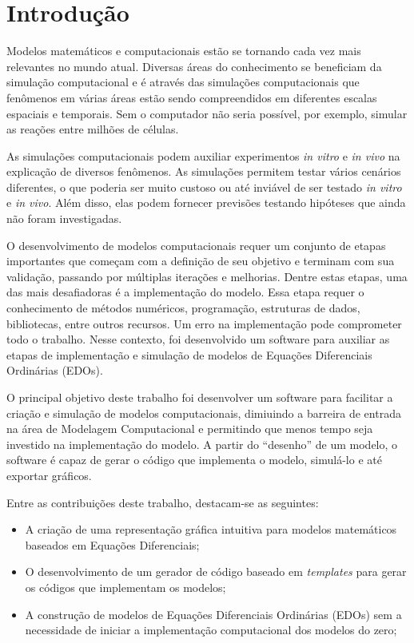 \documentclass[
	12pt,				%
	openright,			%
	oneside,			%
	a4paper,			%
	main=brazil,
	english,			%
	]{ufsj-abntex2}
\begin{document}
\chapter{Introdução}

Modelos matemáticos e computacionais estão se tornando cada vez mais relevantes no mundo atual. Diversas áreas do conhecimento se beneficiam da simulação computacional e é através das simulações computacionais que fenômenos em várias áreas estão sendo compreendidos em diferentes escalas espaciais e temporais. Sem o computador não seria possível, por exemplo, simular as reações entre milhões de células. 

As simulações computacionais podem auxiliar experimentos \textit{in vitro} e \textit{in vivo} na explicação de diversos fenômenos. As simulações permitem testar vários cenários diferentes, o que poderia ser muito custoso ou até inviável de ser testado \textit{in vitro} e \textit{in vivo}. Além disso, elas podem fornecer previsões testando hipóteses que ainda não foram investigadas. 

O desenvolvimento de modelos computacionais requer um conjunto de etapas importantes que começam com a definição de seu objetivo e terminam com sua validação, passando por múltiplas iterações e melhorias. Dentre estas etapas, uma das mais desafiadoras é a implementação do modelo. Essa etapa requer o conhecimento de métodos numéricos, programação, estruturas de dados, bibliotecas, entre outros recursos. Um erro na implementação pode comprometer todo o trabalho. 
Nesse contexto, foi desenvolvido um software para auxiliar as etapas de implementação e simulação de modelos de 
Equações Diferenciais Ordinárias (EDOs).

O principal objetivo deste trabalho foi desenvolver um software para facilitar a criação e simulação de modelos computacionais, dimiuindo a barreira de entrada na área de Modelagem Computacional e permitindo que menos tempo seja investido na implementação do modelo. A partir do ``desenho'' de um modelo, o software é capaz de gerar o código que implementa o modelo, simulá-lo e até exportar gráficos.

Entre as contribuições deste trabalho, destacam-se as seguintes: 

\begin{itemize}
    \item A criação de uma representação gráfica intuitiva para modelos matemáticos baseados em Equações Diferenciais; 
    \item O desenvolvimento de um gerador de código baseado em \textit{templates} para gerar os códigos que implementam os modelos; 
    \item A construção de modelos de Equações Diferenciais Ordinárias (EDOs) sem a necessidade de iniciar a implementação computacional dos modelos do zero; 
\end{itemize}
\end{document}
